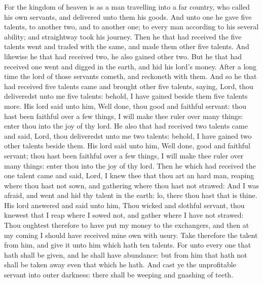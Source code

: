  For the kingdom of heaven is as a man travelling into a
far country, who called his own servants, and delivered unto them his
goods.  And unto one he gave five talents, to another
two, and to another one; to every man according to his several ability;
and straightway took his journey.  Then he that had
received the five talents went and traded with the same, and made them
other five talents.  And likewise he that had received
two, he also gained other two.  But he that had received
one went and digged in the earth, and hid his lord's money.
 After a long time the lord of those servants cometh, and
reckoneth with them.  And so he that had received five
talents came and brought other five talents, saying, Lord, thou
deliveredst unto me five talents: behold, I have gained beside them five
talents more.  His lord said unto him, Well done, thou
good and faithful servant: thou hast been faithful over a few things, I
will make thee ruler over many things: enter thou into the joy of thy
lord.  He also that had received two talents came and
said, Lord, thou deliveredst unto me two talents: behold, I have gained
two other talents beside them.  His lord said unto him,
Well done, good and faithful servant; thou hast been faithful over a few
things, I will make thee ruler over many things: enter thou into the joy
of thy lord.  Then he which had received the one talent
came and said, Lord, I knew thee that thou art an hard man, reaping
where thou hast not sown, and gathering where thou hast not strawed:
 And I was afraid, and went and hid thy talent in the
earth: lo, there thou hast that is thine.  His lord
answered and said unto him, Thou wicked and slothful servant, thou
knewest that I reap where I sowed not, and gather where I have not
strawed:  Thou oughtest therefore to have put my money to
the exchangers, and then at my coming I should have received mine own
with usury.  Take therefore the talent from him, and give
it unto him which hath ten talents.  For unto every one
that hath shall be given, and he shall have abundance: but from him that
hath not shall be taken away even that which he hath. 
And cast ye the unprofitable servant into outer darkness: there shall be
weeping and gnashing of teeth.

